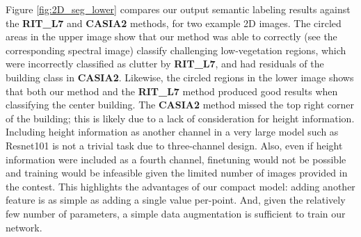 \documentclass[final,3p,times,twocolumn,authoryear]{elsarticle}
\begin{document}
Figure \ref{fig:2D_seg_lower} compares our output semantic labeling results against the {\bf RIT\_L7} and {\bf CASIA2} methods, for two example 2D images. 
The circled areas in the upper image show that our method was able to correctly (see the corresponding spectral image) classify challenging low-vegetation regions, which were incorrectly classified as clutter by {\bf RIT\_L7}, and had residuals of the building class in {\bf CASIA2}. 
Likewise, the circled regions in the lower image shows that both our method and the {\bf RIT\_L7} method produced good results when classifying the center building. 
The {\bf CASIA2} method missed the top right corner of the building; this is likely due to a lack of consideration for height information. 
Including height information as another channel in a very large model such as Resnet101 is not a trivial task due to three-channel design.  
Also, even if height information were included as a fourth channel, finetuning would not be possible and training would be infeasible given the limited number of images provided in the contest. 
This highlights the advantages of our compact model: adding another feature is as simple as adding a single value per-point. 
And, given the relatively few number of parameters, a simple data augmentation is sufficient to train our network.
\end{document}
